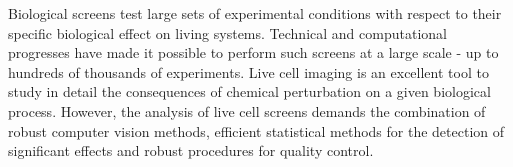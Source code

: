 \documentclass[12pt]{article}
\begin{document}
%
%  
%
Biological screens test large sets of experimental conditions with respect to their specific biological effect on living systems. Technical and computational progresses have made it possible to perform such screens at a large scale - up to hundreds of thousands of experiments. %
Live cell imaging is an excellent tool to study in detail the consequences of chemical perturbation on a given biological process. However, the analysis of live cell screens demands the combination of robust computer vision methods, efficient statistical methods for the detection of significant effects and robust procedures for quality control. %
\end{document}
